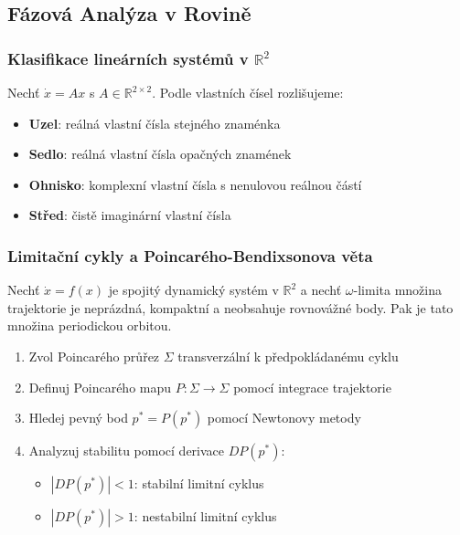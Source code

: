\spc

\subsection{Fázová Analýza v Rovině}

\subsubsection{Klasifikace lineárních systémů v $\mathbb{R}^2$}

\begin{theorem}
Nechť $\dot{x} = Ax$ s $A \in \mathbb{R}^{2\times 2}$. Podle vlastních čísel rozlišujeme:
\begin{itemize}
\item \textbf{Uzel}: reálná vlastní čísla stejného znaménka
\item \textbf{Sedlo}: reálná vlastní čísla opačných znamének  
\item \textbf{Ohnisko}: komplexní vlastní čísla s nenulovou reálnou částí
\item \textbf{Střed}: čistě imaginární vlastní čísla
\end{itemize}
\end{theorem}

\subsubsection{Limitační cykly a Poincarého-Bendixsonova věta}

\begin{theorem}
Nechť $\dot{x} = f(x)$ je spojitý dynamický systém v $\mathbb{R}^2$ a nechť $\omega$-limita množina trajektorie je neprázdná, kompaktní a neobsahuje rovnovážné body. Pak je tato množina periodickou orbitou.
\end{theorem}


\begin{application}
\label{app:limit_cycle_detection}
\begin{enumerate}
\item Zvol Poincarého průřez $\Sigma$ transverzální k předpokládanému cyklu
\item Definuj Poincarého mapu $P: \Sigma \to \Sigma$ pomocí integrace trajektorie
\item Hledej pevný bod $p^* = P(p^*)$ pomocí Newtonovy metody
\item Analyzuj stabilitu pomocí derivace $DP(p^*)$:
   \begin{itemize}
   \item $|DP(p^*)| < 1$: stabilní limitní cyklus
   \item $|DP(p^*)| > 1$: nestabilní limitní cyklus
   \end{itemize}
\end{enumerate}
\end{application}

